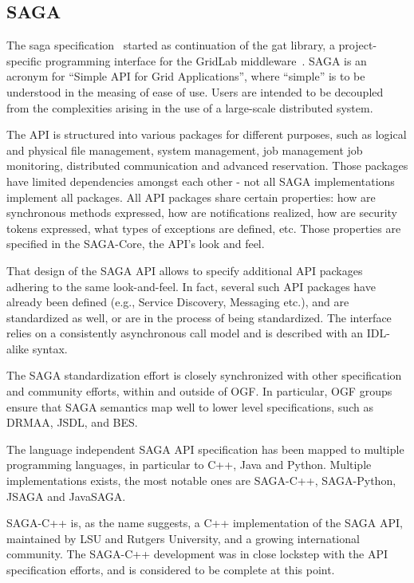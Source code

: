 \documentclass[twocolumn]{svjour3}       %
\begin{document}
\subsection{SAGA}

The \gls{saga} specification~\cite{saga} started as continuation of the \gls{gat} library, a project-specific programming interface for the GridLab middleware~\cite{allen03enabling}. SAGA is an acronym for ``Simple API for Grid Applications'', where ``simple'' is to be understood in the measing of ease of use. Users are intended to be decoupled from the complexities arising in the use of a large-scale distributed system. 

The API is structured into various packages for different purposes, such as logical and physical file management, system management, job management job monitoring, distributed communication and advanced reservation.  Those packages have limited dependencies amongst each other - not all SAGA implementations implement all packages.  All API packages share certain properties: how are synchronous methods expressed, how are notifications realized, how are security tokens expressed, what types of exceptions are defined, etc.  Those properties are specified in the SAGA-Core, the API's look and feel.

That design of the SAGA API allows to specify additional API packages adhering to the same look-and-feel.  In fact, several such API packages have already been defined (e.g., Service Discovery, Messaging etc.), and are standardized as well, or are in the process of being standardized. The interface relies on a consistently asynchronous call model and is described with an IDL-alike syntax.

The SAGA standardization effort is closely synchronized with other specification and community efforts, within and outside of OGF.  In particular, OGF groups ensure that SAGA semantics map well to lower level specifications, such as DRMAA, JSDL, and BES.

The language independent SAGA API specification has been mapped to multiple programming languages, in particular to C++, Java and Python.  Multiple implementations exists, the most notable ones are SAGA-C++, SAGA-Python, JSAGA and JavaSAGA.

SAGA-C++ is, as the name suggests, a C++ implementation of the SAGA API, maintained by LSU and Rutgers University, and a growing international community.  The SAGA-C++ development was in close lockstep with the API specification efforts, and is considered to be complete at this point.
\end{document}
